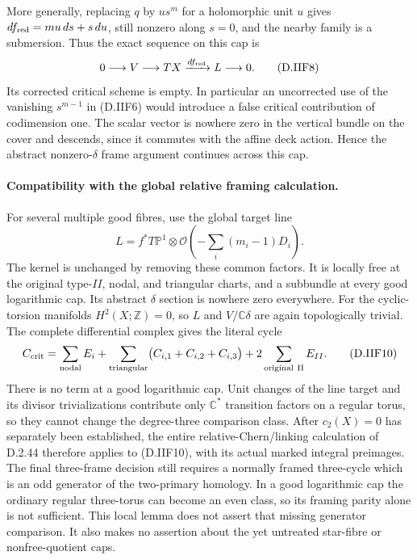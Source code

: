 More generally, replacing $q$ by $u s^m$ for a holomorphic
unit $u$ gives $df_{\rm red}=mu\,ds+s\,du$, still nonzero
along $s=0$, and the nearby family is a submersion.  Thus
the exact sequence on this cap is
\[
                  0\longrightarrow V\longrightarrow TX
                      \xrightarrow{df_{\rm red}}L
                       \longrightarrow0.
 \tag{D.IIF8}
\]
Its corrected critical scheme is empty.  In particular an
uncorrected use of the vanishing $s^{m-1}$ in (D.IIF6) would
introduce a false critical contribution of codimension one.
The scalar vector is nowhere zero in the vertical bundle on
the cover and descends, since it commutes with the affine
deck action.  Hence the abstract nonzero-$\delta$ frame
argument continues across this cap.

\paragraph{Compatibility with the global relative framing calculation.}
For several multiple good fibres, use the global target line
\[
 L=f^*T\mathbb P^1\otimes
       \mathcal O\left(-\sum_i(m_i-1)D_i\right).
 \tag{D.IIF9}
\]
The kernel is unchanged by removing these common factors.
It is locally free at the original type-$II$, nodal, and
triangular charts, and a subbundle at every good logarithmic
cap.  Its abstract $\delta$ section is nowhere zero everywhere.
For the cyclic-torsion manifolds $H^2(X;\mathbb Z)=0$, so $L$
and $V/\mathbb C\delta$ are again topologically trivial.
The complete differential complex gives the literal cycle
\[
 C_{\rm crit}=\sum_{\rm nodal}E_i+
                \sum_{\rm triangular}\bigl(C_{i,1}+C_{i,2}+C_{i,3}\bigr)
                  +2\sum_{\rm original\ II}E_{II}.
 \tag{D.IIF10}
\]
There is no term at a good logarithmic cap.  Unit changes of
the line target and its divisor trivializations contribute
only $\mathbb C^*$ transition factors on a regular torus,
so they cannot change the degree-three comparison class.
After $c_2(X)=0$ has separately been established, the entire
relative-Chern/linking calculation of D.2.44 therefore applies
to (D.IIF10), with its actual marked integral preimages.
The final three-frame decision still requires a normally
framed three-cycle which is an odd generator of the
two-primary homology.  In a good logarithmic cap the ordinary
regular three-torus can become an even class, so its framing
parity alone is not sufficient.  This local lemma does not
assert that missing generator comparison.  It also makes no
assertion about the yet untreated star-fibre or nonfree-quotient
caps.
